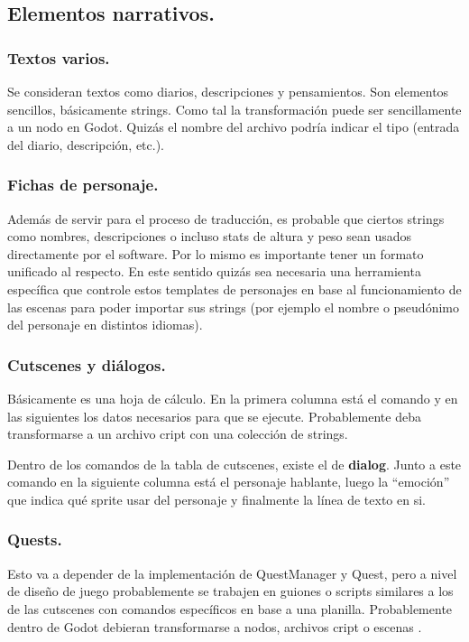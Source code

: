 \subsection{Elementos narrativos.}\label{kit:elementos-narrativos}

\subsubsection{Textos varios.}\label{kit:textos-varios}
Se consideran textos como diarios, descripciones y pensamientos. Son elementos sencillos, básicamente strings. Como tal la transformación puede ser sencillamente a un nodo en Godot. Quizás el nombre del archivo podría indicar el tipo (entrada del diario, descripción, etc.). 

\subsubsection{Fichas de personaje.}\label{kit:fichas-de-personaje}
Además de servir para el proceso de traducción, es probable que ciertos strings como nombres, descripciones o incluso stats de altura y peso sean usados directamente por el software. Por lo mismo es importante tener un formato unificado al respecto. En este sentido quizás sea necesaria una herramienta específica que controle estos templates de personajes en base al funcionamiento de las escenas para poder importar sus strings (por ejemplo el nombre o pseudónimo del personaje en distintos idiomas).

\subsubsection{Cutscenes y diálogos.}\label{kit:cutscenes-y-dialogos}
Básicamente es una hoja de cálculo. En la primera columna está el comando y en las siguientes los datos necesarios para que se ejecute. Probablemente deba transformarse a un archivo cript con una colección de strings.

Dentro de los comandos de la tabla de cutscenes, existe el de \textbf{dialog}. Junto a este comando en la siguiente columna está el personaje hablante, luego la “emoción” que indica qué sprite usar del personaje y finalmente la línea de texto en si.

\subsubsection{Quests.}\label{kit:quests}
Esto va a depender de la implementación de QuestManager y Quest, pero a nivel de diseño de juego probablemente se trabajen en guiones o scripts similares a los de las cutscenes con comandos específicos en base a una planilla. Probablemente dentro de Godot debieran transformarse a nodos, archivos cript o escenas .

